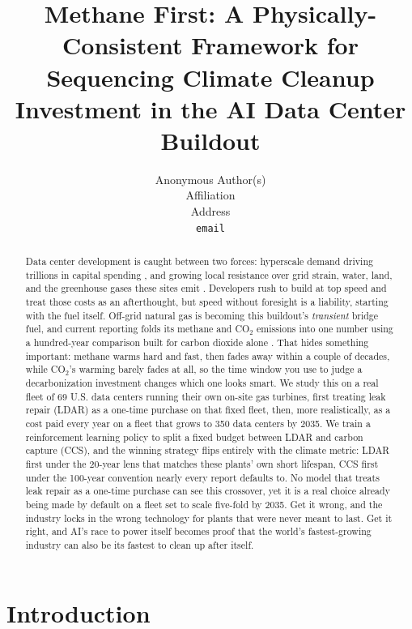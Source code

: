 \documentclass{article}
\title{Methane First: A Physically-Consistent Framework for Sequencing
Climate Cleanup Investment in the AI Data Center Buildout}
\author{
  Anonymous Author(s) \\
  Affiliation \\
  Address \\
  \texttt{email}
}
\begin{document}
\maketitle

\begin{abstract}
Data center development is caught between two forces: hyperscale demand
driving trillions in capital spending
\cite{bloombergnef2025aipowergrid,ucs2026datacenterpowerplay}, and
growing local resistance over grid strain, water, land, and the
greenhouse gases these sites emit
\cite{gallup2026opposedatacenters,umich2025datacentersimpact}.
Developers rush to build at top speed and treat those costs as an
afterthought, but speed without foresight is a liability, starting with
the fuel itself. Off-grid natural gas is becoming this buildout's
\emph{transient} bridge fuel, and current reporting folds its methane
and CO$_2$ emissions into one
number using a hundred-year comparison built for carbon dioxide alone
\cite{eip2026powerbehindai}. That hides something important: methane
warms hard and fast, then fades away within a couple of decades, while
CO$_2$'s warming barely fades at all, so the time window you use to
judge a decarbonization investment changes which one looks smart. We
study this on a real fleet of 69 U.S. data centers running their own
on-site gas turbines, first treating leak repair (LDAR) as a one-time
purchase on that fixed fleet, then, more realistically, as a cost paid
every year on a fleet that grows to 350 data centers by 2035. We train
a reinforcement learning policy to split a fixed budget between LDAR
and carbon capture (CCS), and the winning strategy flips entirely with
the climate metric: LDAR first under the 20-year lens that matches
these plants' own short lifespan, CCS first under the 100-year
convention nearly every report defaults to. No model that treats leak
repair as a one-time purchase can see this crossover, yet it is a real
choice already being made by default on a fleet set to scale five-fold
by 2035. Get it wrong, and the industry locks in the wrong technology
for plants that were never meant to last. Get it right, and AI's race
to power itself becomes proof that the world's fastest-growing
industry can also be its fastest to clean up after itself.
\end{abstract}

\section{Introduction}
\label{sec:intro}
\end{document}
